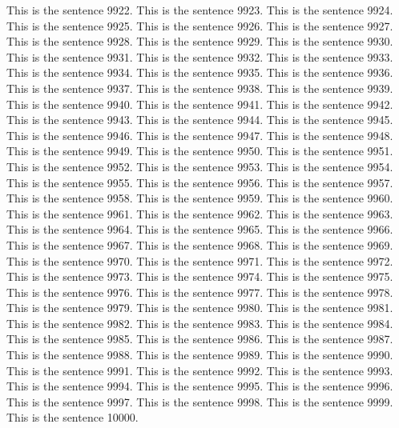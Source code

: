 \documentclass{article}
\begin{document}
This is the sentence 9922.
This is the sentence 9923.
This is the sentence 9924.
This is the sentence 9925.
This is the sentence 9926.
This is the sentence 9927.
This is the sentence 9928.
This is the sentence 9929.
This is the sentence 9930.
This is the sentence 9931.
This is the sentence 9932.
This is the sentence 9933.
This is the sentence 9934.
This is the sentence 9935.
This is the sentence 9936.
This is the sentence 9937.
This is the sentence 9938.
This is the sentence 9939.
This is the sentence 9940.
This is the sentence 9941.
This is the sentence 9942.
This is the sentence 9943.
This is the sentence 9944.
This is the sentence 9945.
This is the sentence 9946.
This is the sentence 9947.
This is the sentence 9948.
This is the sentence 9949.
This is the sentence 9950.
This is the sentence 9951.
This is the sentence 9952.
This is the sentence 9953.
This is the sentence 9954.
This is the sentence 9955.
This is the sentence 9956.
This is the sentence 9957.
This is the sentence 9958.
This is the sentence 9959.
This is the sentence 9960.
This is the sentence 9961.
This is the sentence 9962.
This is the sentence 9963.
This is the sentence 9964.
This is the sentence 9965.
This is the sentence 9966.
This is the sentence 9967.
This is the sentence 9968.
This is the sentence 9969.
This is the sentence 9970.
This is the sentence 9971.
This is the sentence 9972.
This is the sentence 9973.
This is the sentence 9974.
This is the sentence 9975.
This is the sentence 9976.
This is the sentence 9977.
This is the sentence 9978.
This is the sentence 9979.
This is the sentence 9980.
This is the sentence 9981.
This is the sentence 9982.
This is the sentence 9983.
This is the sentence 9984.
This is the sentence 9985.
This is the sentence 9986.
This is the sentence 9987.
This is the sentence 9988.
This is the sentence 9989.
This is the sentence 9990.
This is the sentence 9991.
This is the sentence 9992.
This is the sentence 9993.
This is the sentence 9994.
This is the sentence 9995.
This is the sentence 9996.
This is the sentence 9997.
This is the sentence 9998.
This is the sentence 9999.
This is the sentence 10000.
\end{document}
